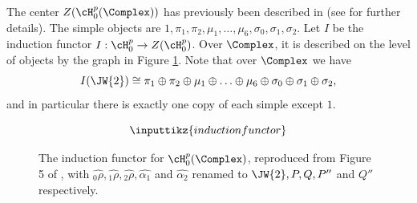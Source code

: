 
The center $Z(\cH_0^p(\Complex))$ has previously been described in \cite{MR1832764} (see \cite{MR2468378} for further details). The simple objects are $1, \pi_1, \pi_2, \mu_1, \ldots, \mu_6, \sigma_0, \sigma_1, \sigma_2$.  Let $I$ be the induction functor $I: \cH_0^p \rightarrow Z(\cH_0^p)$. Over $\Complex$, it is described on the level of objects by the graph in Figure \ref{fig:izumi-induction}. Note that over $\Complex$ we have $$I(\JW{2}) \cong \pi_1 \oplus \pi_2 \oplus \mu_1 \oplus \ldots \oplus \mu_6 \oplus \sigma_0 \oplus \sigma_1 \oplus \sigma_2,$$ and in particular there is exactly one copy of each simple except $1$.

\newcommand{\fig}[3]{%
	\begin{figure}[!htb]
	#3
	\caption{#2}
	\label{fig:#1}	
	\end{figure}
}

\fig{izumi-induction}{The induction functor for $\cH_0^p(\Complex)$, reproduced from Figure 5 of  \cite{MR1832764}, with $\widehat{{}_0\rho}, \widehat{{}_1\rho}, \widehat{{}_2\rho}, \widehat{\alpha_1}$ and $\widehat{\alpha_2}$ renamed to $\JW{2}, P, Q, P''$ and $Q''$  respectively.}{$$\inputtikz{inductionfunctor}$$}



